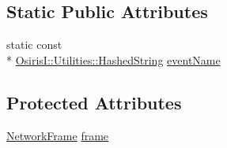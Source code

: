 \subsection*{Static Public Attributes}
\begin{DoxyCompactItemize}
\item 
static const \\*
\hyperlink{class_osiris_i_1_1_utilities_1_1_hashed_string}{Osiris\-I\-::\-Utilities\-::\-Hashed\-String} \hyperlink{struct_osiris_i_1_1_events_1_1_osiris_i___network_data_event_ac0b6f4c3eb9825fc7217422d3c724204}{event\-Name}
\end{DoxyCompactItemize}
\subsection*{Protected Attributes}
\begin{DoxyCompactItemize}
\item 
\hyperlink{struct_osiris_i_1_1_network_frame}{Network\-Frame} \hyperlink{struct_osiris_i_1_1_events_1_1_osiris_i___network_data_event_a224912e24dbfd639fd359d65891a2879}{frame}
\end{DoxyCompactItemize}


